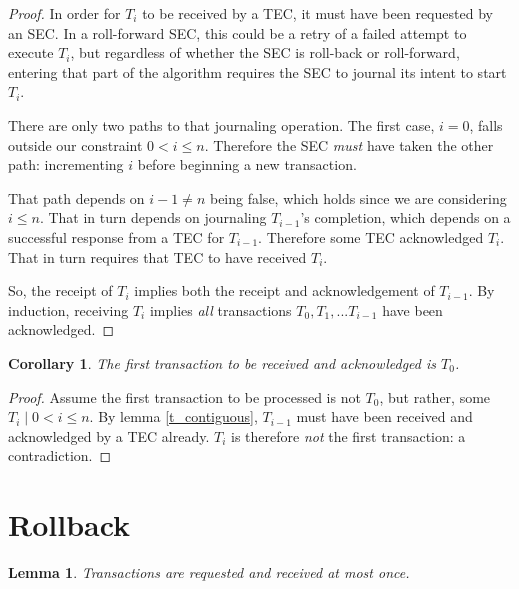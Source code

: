 \documentclass{article}
\newtheorem{corollary}{Corollary}[section]
\newtheorem{lemma}{Lemma}[section]
\begin{document}
\begin{proof}

In order for $T_i$ to be received by a TEC, it must have been requested by an
SEC. In a roll-forward SEC, this could be a retry of a failed attempt to
execute $T_i$, but regardless of whether the SEC is roll-back or roll-forward,
entering that part of the algorithm requires the SEC to journal its intent to
start $T_i$.

There are only two paths to that journaling operation. The first case, $i = 0$,
falls outside our constraint $0 < i \le n$. Therefore the SEC \textit{must}
have taken the other path: incrementing $i$ before beginning a new transaction.

That path depends on $i - 1 \ne n$ being false, which holds since we are
considering $i \le n$. That in turn depends on journaling $T_{i-1}$'s
completion, which depends on a successful response from a TEC for $T_{i-1}$.
Therefore some TEC acknowledged $T_i$. That in turn requires that TEC to have
received $T_i$.

So, the receipt of $T_i$ implies both the receipt and acknowledgement of
$T_{i-1}$. By induction, receiving $T_i$ implies \textit{all} transactions
$T_0, T_1, ... T_{i-1}$ have been acknowledged.

\end{proof}

\begin{corollary}
\label{t_zero_first}
The first transaction to be received and acknowledged is $T_0$.
\end{corollary}

\begin{proof}
Assume the first transaction to be processed is not $T_0$, but rather, some
$T_i \mid 0 < i \le n$. By lemma \ref{t_contiguous}, $T_{i-1}$ must have been
received and acknowledged by a TEC already. $T_i$ is therefore \textit{not} the
first transaction: a contradiction.
\end{proof}

\section{Rollback}

\begin{lemma}
\label{t_at_most_once}
Transactions are requested and received at most once.
\end{lemma}
\end{document}
